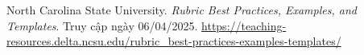 \begin{thebibliography}{1}
	North Carolina State University. \textit{Rubric Best Practices, Examples, and Templates}. Truy cập ngày 06/04/2025. \url{https://teaching-resources.delta.ncsu.edu/rubric_best-practices-examples-templates/}
\end{thebibliography}
